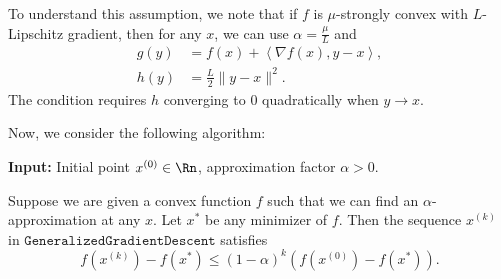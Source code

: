 To understand this assumption, we note that if $f$ is $\mu$-strongly
convex with $L$-Lipschitz gradient, then for any $x$, we can use
$\alpha=\frac{\mu}{L}$ and
\begin{align*}
g(y) & =f(x)+\left\langle \nabla f(x),y-x\right\rangle ,\\
h(y) & =\frac{L}{2}\|y-x\|^{2}.
\end{align*}
The condition requires $h$ converging to $0$ quadratically when
$y\rightarrow x$. 

Now, we consider the following algorithm:

\begin{algorithm2e}[H]

\caption{$\mathtt{GeneralizedGradientDescent}$}

\SetAlgoLined

\textbf{Input:} Initial point $x^{(0)}\in\Rn$, approximation factor
$\alpha>0$.


\end{algorithm2e}
\begin{thm}
\label{thm:gd_general_apx} Suppose we are given a convex function
$f$ such that we can find an $\alpha$-approximation at any $x$.
Let $x^{*}$ be any minimizer of $f$. Then the sequence $x^{(k)}$
in $\mathtt{GeneralizedGradientDescent}$ satisfies
\[
f(x^{(k)})-f(x^{*})\leq(1-\alpha)^{k}(f(x^{(0)})-f(x^{*})).
\]
\end{thm}

